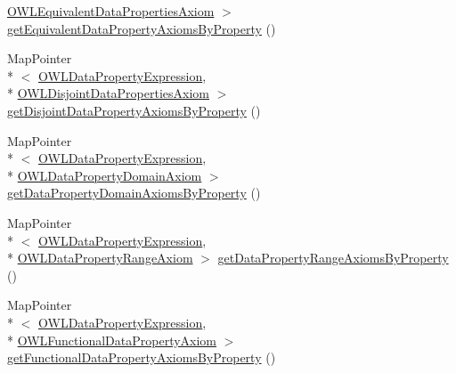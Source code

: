 \begin{DoxyCompactItemize}
\hyperlink{interfaceorg_1_1semanticweb_1_1owlapi_1_1model_1_1_o_w_l_equivalent_data_properties_axiom}{O\-W\-L\-Equivalent\-Data\-Properties\-Axiom} $>$ \hyperlink{classuk_1_1ac_1_1manchester_1_1cs_1_1owl_1_1owlapi_1_1_abstract_internals_impl_ac8d37d0cb67aa3a458c0fe41c25bf903}{get\-Equivalent\-Data\-Property\-Axioms\-By\-Property} ()
\item 
Map\-Pointer\\*
$<$ \hyperlink{interfaceorg_1_1semanticweb_1_1owlapi_1_1model_1_1_o_w_l_data_property_expression}{O\-W\-L\-Data\-Property\-Expression}, \\*
\hyperlink{interfaceorg_1_1semanticweb_1_1owlapi_1_1model_1_1_o_w_l_disjoint_data_properties_axiom}{O\-W\-L\-Disjoint\-Data\-Properties\-Axiom} $>$ \hyperlink{classuk_1_1ac_1_1manchester_1_1cs_1_1owl_1_1owlapi_1_1_abstract_internals_impl_a1fa41261ff6b0cd6dabbcdee8d5f9da1}{get\-Disjoint\-Data\-Property\-Axioms\-By\-Property} ()
\item 
Map\-Pointer\\*
$<$ \hyperlink{interfaceorg_1_1semanticweb_1_1owlapi_1_1model_1_1_o_w_l_data_property_expression}{O\-W\-L\-Data\-Property\-Expression}, \\*
\hyperlink{interfaceorg_1_1semanticweb_1_1owlapi_1_1model_1_1_o_w_l_data_property_domain_axiom}{O\-W\-L\-Data\-Property\-Domain\-Axiom} $>$ \hyperlink{classuk_1_1ac_1_1manchester_1_1cs_1_1owl_1_1owlapi_1_1_abstract_internals_impl_aff29d135d3740d1ad2e8ce65abd2407f}{get\-Data\-Property\-Domain\-Axioms\-By\-Property} ()
\item 
Map\-Pointer\\*
$<$ \hyperlink{interfaceorg_1_1semanticweb_1_1owlapi_1_1model_1_1_o_w_l_data_property_expression}{O\-W\-L\-Data\-Property\-Expression}, \\*
\hyperlink{interfaceorg_1_1semanticweb_1_1owlapi_1_1model_1_1_o_w_l_data_property_range_axiom}{O\-W\-L\-Data\-Property\-Range\-Axiom} $>$ \hyperlink{classuk_1_1ac_1_1manchester_1_1cs_1_1owl_1_1owlapi_1_1_abstract_internals_impl_aee9e5122361106290391d8e11198b0b9}{get\-Data\-Property\-Range\-Axioms\-By\-Property} ()
\item 
Map\-Pointer\\*
$<$ \hyperlink{interfaceorg_1_1semanticweb_1_1owlapi_1_1model_1_1_o_w_l_data_property_expression}{O\-W\-L\-Data\-Property\-Expression}, \\*
\hyperlink{interfaceorg_1_1semanticweb_1_1owlapi_1_1model_1_1_o_w_l_functional_data_property_axiom}{O\-W\-L\-Functional\-Data\-Property\-Axiom} $>$ \hyperlink{classuk_1_1ac_1_1manchester_1_1cs_1_1owl_1_1owlapi_1_1_abstract_internals_impl_a5294fa08c1551393ed400fd57f0d69b0}{get\-Functional\-Data\-Property\-Axioms\-By\-Property} ()

\end{DoxyCompactItemize}
